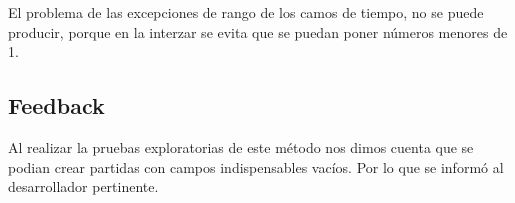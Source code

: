 El problema de las excepciones de rango de los camos de tiempo, no se puede producir, porque en la interzar se evita que se puedan poner números menores de 1.

\subsection{Feedback}

Al realizar la pruebas exploratorias de este método nos dimos cuenta que se podian crear partidas con campos indispensables vacíos. Por lo que se informó al desarrollador pertinente.
